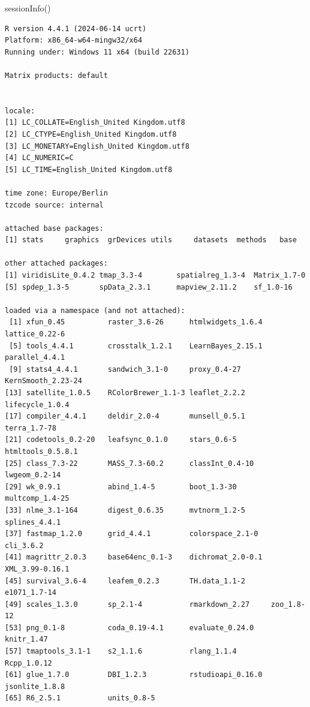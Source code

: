 \documentclass[
  letterpaper,
  DIV=11,
  numbers=noendperiod]{scrreprt}
\newenvironment{Shaded}{\begin{snugshade}}{\end{snugshade}}
\newcommand{\FunctionTok}[1]{\textcolor[rgb]{0.28,0.35,0.67}{#1}}
\newcommand{\NormalTok}[1]{\textcolor[rgb]{0.00,0.23,0.31}{#1}}
\begin{document}
\begin{Shaded}
\begin{Highlighting}[]
\FunctionTok{sessionInfo}\NormalTok{()}
\end{Highlighting}
\end{Shaded}

\begin{verbatim}
R version 4.4.1 (2024-06-14 ucrt)
Platform: x86_64-w64-mingw32/x64
Running under: Windows 11 x64 (build 22631)

Matrix products: default


locale:
[1] LC_COLLATE=English_United Kingdom.utf8 
[2] LC_CTYPE=English_United Kingdom.utf8   
[3] LC_MONETARY=English_United Kingdom.utf8
[4] LC_NUMERIC=C                           
[5] LC_TIME=English_United Kingdom.utf8    

time zone: Europe/Berlin
tzcode source: internal

attached base packages:
[1] stats     graphics  grDevices utils     datasets  methods   base     

other attached packages:
[1] viridisLite_0.4.2 tmap_3.3-4        spatialreg_1.3-4  Matrix_1.7-0     
[5] spdep_1.3-5       spData_2.3.1      mapview_2.11.2    sf_1.0-16        

loaded via a namespace (and not attached):
 [1] xfun_0.45          raster_3.6-26      htmlwidgets_1.6.4  lattice_0.22-6    
 [5] tools_4.4.1        crosstalk_1.2.1    LearnBayes_2.15.1  parallel_4.4.1    
 [9] stats4_4.4.1       sandwich_3.1-0     proxy_0.4-27       KernSmooth_2.23-24
[13] satellite_1.0.5    RColorBrewer_1.1-3 leaflet_2.2.2      lifecycle_1.0.4   
[17] compiler_4.4.1     deldir_2.0-4       munsell_0.5.1      terra_1.7-78      
[21] codetools_0.2-20   leafsync_0.1.0     stars_0.6-5        htmltools_0.5.8.1 
[25] class_7.3-22       MASS_7.3-60.2      classInt_0.4-10    lwgeom_0.2-14     
[29] wk_0.9.1           abind_1.4-5        boot_1.3-30        multcomp_1.4-25   
[33] nlme_3.1-164       digest_0.6.35      mvtnorm_1.2-5      splines_4.4.1     
[37] fastmap_1.2.0      grid_4.4.1         colorspace_2.1-0   cli_3.6.2         
[41] magrittr_2.0.3     base64enc_0.1-3    dichromat_2.0-0.1  XML_3.99-0.16.1   
[45] survival_3.6-4     leafem_0.2.3       TH.data_1.1-2      e1071_1.7-14      
[49] scales_1.3.0       sp_2.1-4           rmarkdown_2.27     zoo_1.8-12        
[53] png_0.1-8          coda_0.19-4.1      evaluate_0.24.0    knitr_1.47        
[57] tmaptools_3.1-1    s2_1.1.6           rlang_1.1.4        Rcpp_1.0.12       
[61] glue_1.7.0         DBI_1.2.3          rstudioapi_0.16.0  jsonlite_1.8.8    
[65] R6_2.5.1           units_0.8-5       
\end{verbatim}
\end{document}
